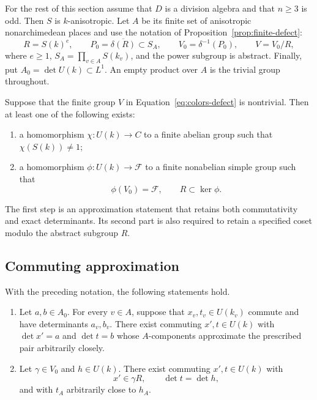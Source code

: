 For the rest of this section assume that $D$ is a division algebra and
that $n\geq3$ is odd.  Then $S$ is $k$-anisotropic.  Let $A$ be its finite
set of anisotropic nonarchimedean places and use the notation of
Proposition~\ref{prop:finite-defect}:
\begin{equation}\label{eq:colors-defect}
 R=S(k)^e,\qquad
 P_0=\overline{\delta(R)}\subset S_A,
 \qquad V_0=\delta^{-1}(P_0),\qquad V=V_0/R,
\end{equation}
where $e\geq1$, $S_A=\prod_{v\in A}S(k_v)$, and the power subgroup is
abstract.  Finally, put $A_0=\det U(k)\subset L^1$.  An empty product over
$A$ is the trivial group throughout.

\begin{proposition}\label{prop:color-dichotomy}
Suppose that the finite group $V$ in Equation~\eqref{eq:colors-defect} is
nontrivial.  Then at least one of the following exists:
\begin{enumerate}[label=\textup{(\roman*)}]
 \item a homomorphism $\chi:U(k)\to C$ to a finite abelian group such
 that $\chi(S(k))\ne1$;
 \item a homomorphism $\phi:U(k)\to\mathcal F$ to a finite nonabelian
 simple group such that
 \[
  \phi(V_0)=\mathcal F,\qquad R\subset\ker\phi.
 \]
\end{enumerate}
\end{proposition}

The first step is an approximation statement that retains both
commutativity and exact determinants.  Its second part is also required
to retain a specified coset modulo the abstract subgroup $R$.

\subsection{Commuting approximation}

\begin{proposition}\label{prop:commuting-approximation}
With the preceding notation, the following statements hold.
\begin{enumerate}[label=\textup{(\roman*)}]
 \item Let $a,b\in A_0$.  For every $v\in A$, suppose that
 $x_v,t_v\in U(k_v)$ commute and have determinants $a_v,b_v$.
 There exist commuting $x',t\in U(k)$ with
 $\det x'=a$ and $\det t=b$ whose $A$-components approximate the
 prescribed pair arbitrarily closely.
 \item Let $\gamma\in V_0$ and $h\in U(k)$.  There exist commuting
 $x',t\in U(k)$ with
 \[
  x'\in\gamma R,\qquad \det t=\det h,
 \]
 and with $t_A$ arbitrarily close to $h_A$.
\end{enumerate}
\end{proposition}

